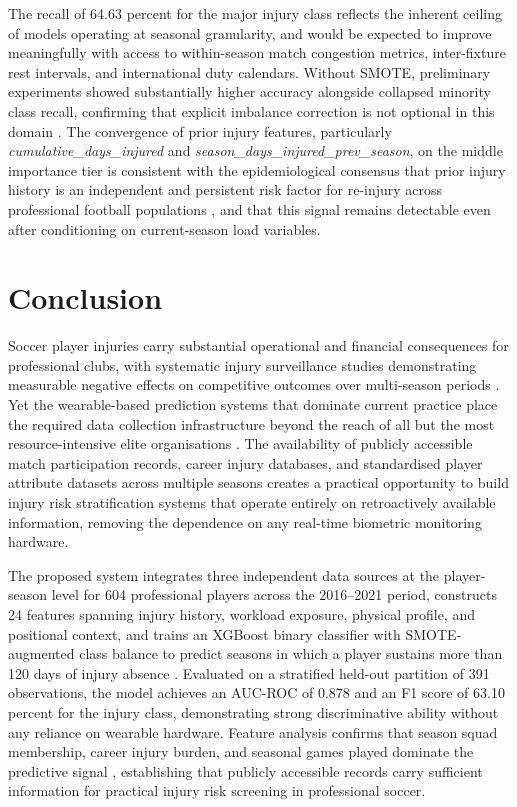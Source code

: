 \documentclass[conference]{IEEEtran}
\begin{document}
The recall of 64.63 percent for the major injury class reflects the inherent ceiling of models operating at seasonal granularity, and would be expected to improve meaningfully with access to within-season match congestion metrics, inter-fixture rest intervals, and international duty calendars. Without SMOTE, preliminary experiments showed substantially higher accuracy alongside collapsed minority class recall, confirming that explicit imbalance correction is not optional in this domain \cite{he2009learning, chawla2002smote}. The convergence of prior injury features, particularly \textit{cumulative\_days\_injured} and \textit{season\_days\_injured\_prev\_season}, on the middle importance tier is consistent with the epidemiological consensus that prior injury history is an independent and persistent risk factor for re-injury across professional football populations \cite{hagglund2006previous, arnason2004risk}, and that this signal remains detectable even after conditioning on current-season load variables.

\section*{Conclusion}
Soccer player injuries carry substantial operational and financial consequences for professional clubs, with systematic injury surveillance studies demonstrating measurable negative effects on competitive outcomes over multi-season periods \cite{ekstrand2011injury, hagglund2013injuries}. Yet the wearable-based prediction systems that dominate current practice place the required data collection infrastructure beyond the reach of all but the most resource-intensive elite organisations \cite{akenhead2016training}. The availability of publicly accessible match participation records, career injury databases, and standardised player attribute datasets across multiple seasons creates a practical opportunity to build injury risk stratification systems that operate entirely on retroactively available information, removing the dependence on any real-time biometric monitoring hardware.

The proposed system integrates three independent data sources at the player-season level for 604 professional players across the 2016--2021 period, constructs 24 features spanning injury history, workload exposure, physical profile, and positional context, and trains an XGBoost binary classifier with SMOTE-augmented class balance to predict seasons in which a player sustains more than 120 days of injury absence \cite{fuller2006consensus}. Evaluated on a stratified held-out partition of 391 observations, the model achieves an AUC-ROC of 0.878 and an F1 score of 63.10 percent for the injury class, demonstrating strong discriminative ability without any reliance on wearable hardware. Feature analysis confirms that season squad membership, career injury burden, and seasonal games played dominate the predictive signal \cite{gabbett2016training, arnason2004risk}, establishing that publicly accessible records carry sufficient information for practical injury risk screening in professional soccer.
\end{document}
